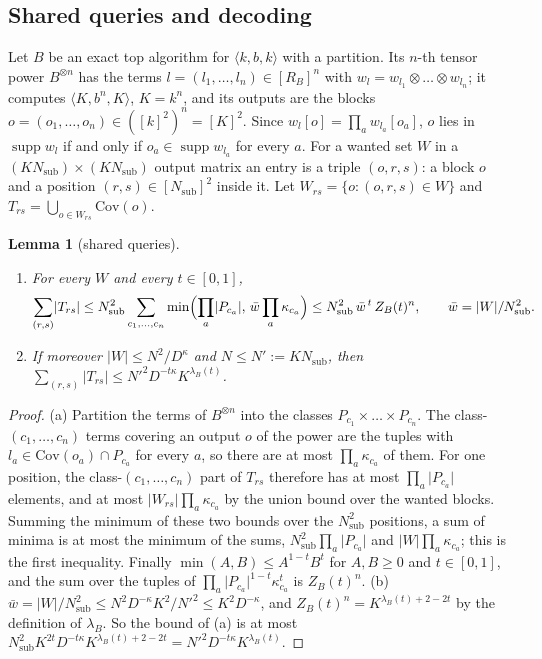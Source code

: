 \documentclass[11pt]{article}
\newtheorem{lemma}[theorem]{Lemma}
\theoremstyle{definition}
\theoremstyle{remark}
\newcommand{\abs}[1]{\lvert #1\rvert}
\DeclareMathOperator{\supp}{supp}
\newcommand{\mat}[3]{\langle #1,#2,#3\rangle} %
\newcommand{\Cov}{\mathrm{Cov}}               %
\newcommand{\ZB}{Z_B}                         %
\newcommand{\lamB}{\lambda_B}                 %
\newcommand{\RB}{R_B}                         %
\begin{document}
\subsection{Shared queries and decoding}\label{cp:sec:shared}

Let $B$ be an exact top algorithm for $\mat kbk$ with a partition. Its $n$-th tensor power $B^{\otimes n}$ has the terms $l=(l_1,\dots,l_n)\in[\RB]^n$ with $w_l=w_{l_1}\otimes\dots\otimes w_{l_n}$; it computes $\mat K{b^n}K$, $K=k^n$, and its outputs are the blocks $o=(o_1,\dots,o_n)\in([k]^2)^n=[K]^2$. Since $w_l[o]=\prod_aw_{l_a}[o_a]$, $o$ lies in $\supp w_l$ if and only if $o_a\in\supp w_{l_a}$ for every $a$. For a wanted set $W$ in a $(KN_{\mathrm{sub}})\times(KN_{\mathrm{sub}})$ output matrix an entry is a triple $(o,r,s)$: a block $o$ and a position $(r,s)\in[N_{\mathrm{sub}}]^2$ inside it. Let $W_{rs}=\{o:(o,r,s)\in W\}$ and $T_{rs}=\bigcup_{o\in W_{rs}}\Cov(o)$.

\begin{lemma}[shared queries]\label{cp:T2}
\begin{enumerate}[label=(\alph*)]
\item For every $W$ and every $t\in[0,1]$,
\[
\sum_{(r,s)}\abs{T_{rs}}\le N_{\mathrm{sub}}^2\sum_{c_1,\dots,c_n}\min\Bigl(\prod_a\abs{P_{c_a}},\,\bar w\prod_a\kappa_{c_a}\Bigr)\le N_{\mathrm{sub}}^2\,\bar w^{\,t}\,\ZB(t)^n,\qquad\bar w=\abs W/N_{\mathrm{sub}}^2.
\]
\item If moreover $\abs W\le N^2/D^\kappa$ and $N\le N':=KN_{\mathrm{sub}}$, then $\sum_{(r,s)}\abs{T_{rs}}\le N'^2D^{-t\kappa}K^{\lamB(t)}$.
\end{enumerate}
\end{lemma}

\begin{proof}
(a) Partition the terms of $B^{\otimes n}$ into the classes $P_{c_1}\times\dots\times P_{c_n}$. The class-$(c_1,\dots,c_n)$ terms covering an output $o$ of the power are the tuples with $l_a\in\Cov(o_a)\cap P_{c_a}$ for every $a$, so there are at most $\prod_a\kappa_{c_a}$ of them. For one position, the class-$(c_1,\dots,c_n)$ part of $T_{rs}$ therefore has at most $\prod_a\abs{P_{c_a}}$ elements, and at most $\abs{W_{rs}}\prod_a\kappa_{c_a}$ by the union bound over the wanted blocks. Summing the minimum of these two bounds over the $N_{\mathrm{sub}}^2$ positions, a sum of minima is at most the minimum of the sums, $N_{\mathrm{sub}}^2\prod_a\abs{P_{c_a}}$ and $\abs W\prod_a\kappa_{c_a}$; this is the first inequality. Finally $\min(A,B)\le A^{1-t}B^t$ for $A,B\ge0$ and $t\in[0,1]$, and the sum over the tuples of $\prod_a\abs{P_{c_a}}^{1-t}\kappa_{c_a}^t$ is $\ZB(t)^n$.
(b) $\bar w=\abs W/N_{\mathrm{sub}}^2\le N^2D^{-\kappa}K^2/N'^2\le K^2D^{-\kappa}$, and $\ZB(t)^n=K^{\lamB(t)+2-2t}$ by the definition of $\lamB$. So the bound of (a) is at most $N_{\mathrm{sub}}^2K^{2t}D^{-t\kappa}K^{\lamB(t)+2-2t}=N'^2D^{-t\kappa}K^{\lamB(t)}$.
\end{proof}
\end{document}
